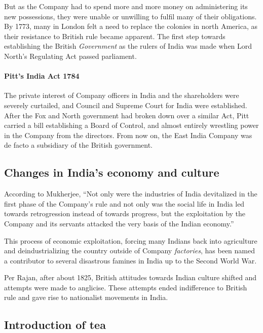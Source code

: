 \documentclass[11pt, a4paper, headings=standardclasses]{scrartcl}
\begin{document}
But as the Company had to spend more and more money on administering its new possessions, they were unable or unwilling to fulfil many of their obligations.\autocite[395]{RF} By 1773, many in London felt a need to replace the colonies in north America, as their resistance to British rule became apparent. The first step towards establishing the British \textit{Government} as the rulers of India was made when Lord North's Regulating Act passed parliament.\autocite[395]{RF, parliament}

\paragraph{Pitt's India Act 1784}

The private interest of Company officers in India and the shareholders were severely curtailed, and Council and Supreme Court for India were established. After the Fox and North government had broken down over a similar Act, Pitt carried a bill establishing a Board of Control, and almost entirely wrestling power in the Company from the directors. From now on, the East India Company was de facto a subsidiary of the British government.\autocite[396]{RF, parliament}

\subsection{Changes in India's economy and culture}
 According to Mukherjee, ``Not only were the industries of India devitalized in the first phase of the Company's rule and not only was the social life in India led towards retrogression instead of towards progress, but the exploitation by the Company and its servants attacked the very basis of the Indian economy.''\autocite[335]{RF}
 
This process of economic exploitation, forcing many Indians back into agriculture and deindustrializing the country outside of Company \textit{factories}, has been named a contributor to several disastrous famines in India up to the Second World War.\autocite[Section III]{tnr}

Per Rajan, after about 1825, British attitudes towards Indian culture shifted and attempts were made to anglicise. These attempts ended indifference to British rule and gave rise to nationalist movements in India.\autocite[90]{rajan}

\subsection{Introduction of tea}
\end{document}

